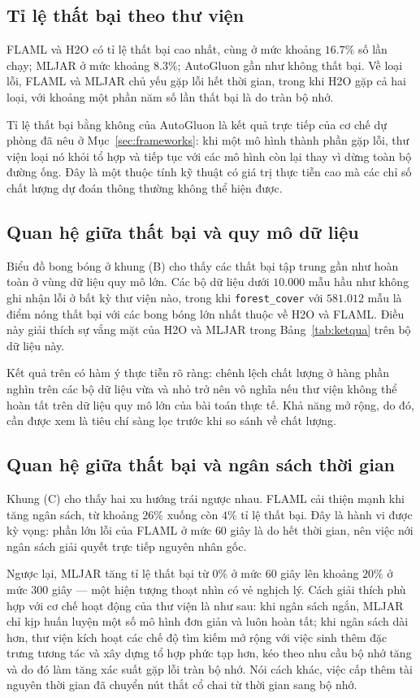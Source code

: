 \subsection{Tỉ lệ thất bại theo thư viện}
FLAML và H2O có tỉ lệ thất bại cao nhất, cùng ở mức khoảng $16.7\%$ số lần chạy;
MLJAR ở mức khoảng $8.3\%$; AutoGluon gần như không thất bại. Về loại lỗi, FLAML
và MLJAR chủ yếu gặp lỗi hết thời gian, trong khi H2O gặp cả hai loại, với khoảng
một phần năm số lần thất bại là do tràn bộ nhớ.

Tỉ lệ thất bại bằng không của AutoGluon là kết quả trực tiếp của cơ chế dự phòng
đã nêu ở Mục~\ref{sec:frameworks}: khi một mô hình thành phần gặp lỗi, thư viện
loại nó khỏi tổ hợp và tiếp tục với các mô hình còn lại thay vì dừng toàn bộ đường
ống. Đây là một thuộc tính kỹ thuật có giá trị thực tiễn cao mà các chỉ số chất
lượng dự đoán thông thường không thể hiện được.

\subsection{Quan hệ giữa thất bại và quy mô dữ liệu}
Biểu đồ bong bóng ở khung (B) cho thấy các thất bại tập trung gần như hoàn toàn ở
vùng dữ liệu quy mô lớn. Các bộ dữ liệu dưới $10.000$ mẫu hầu như không ghi nhận
lỗi ở bất kỳ thư viện nào, trong khi \texttt{forest\_cover} với $581.012$ mẫu là
điểm nóng thất bại với các bong bóng lớn nhất thuộc về H2O và FLAML. Điều này giải
thích sự vắng mặt của H2O và MLJAR trong Bảng~\ref{tab:ketqua} trên bộ dữ liệu
này.

Kết quả trên có hàm ý thực tiễn rõ ràng: chênh lệch chất lượng ở hàng phần nghìn
trên các bộ dữ liệu vừa và nhỏ trở nên vô nghĩa nếu thư viện không thể hoàn tất
trên dữ liệu quy mô lớn của bài toán thực tế. Khả năng mở rộng, do đó, cần được
xem là tiêu chí sàng lọc trước khi so sánh về chất lượng.

\subsection{Quan hệ giữa thất bại và ngân sách thời gian}
Khung (C) cho thấy hai xu hướng trái ngược nhau. FLAML cải thiện mạnh khi tăng
ngân sách, từ khoảng $26\%$ xuống còn $4\%$ tỉ lệ thất bại. Đây là hành vi được
kỳ vọng: phần lớn lỗi của FLAML ở mức $60$ giây là do hết thời gian, nên việc nới
ngân sách giải quyết trực tiếp nguyên nhân gốc.

Ngược lại, MLJAR tăng tỉ lệ thất bại từ $0\%$ ở mức $60$ giây lên khoảng $20\%$ ở
mức $300$ giây --- một hiện tượng thoạt nhìn có vẻ nghịch lý. Cách giải thích phù
hợp với cơ chế hoạt động của thư viện là như sau: khi ngân sách ngắn, MLJAR chỉ
kịp huấn luyện một số mô hình đơn giản và luôn hoàn tất; khi ngân sách dài hơn,
thư viện kích hoạt các chế độ tìm kiếm mở rộng với việc sinh thêm đặc trưng tương
tác và xây dựng tổ hợp phức tạp hơn, kéo theo nhu cầu bộ nhớ tăng và do đó làm
tăng xác suất gặp lỗi tràn bộ nhớ. Nói cách khác, việc cấp thêm tài nguyên thời
gian đã chuyển nút thắt cổ chai từ thời gian sang bộ nhớ.

